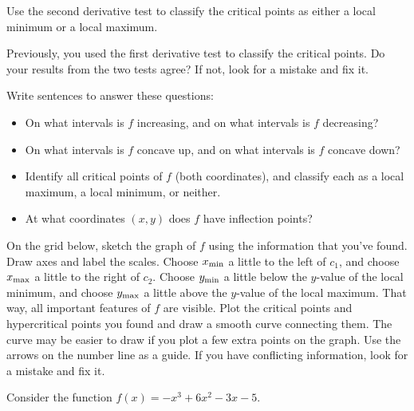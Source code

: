 \begin{ProblemSet}
\begin{Problem}[pencil space=0in]
 \end{Problem}

 \begin{Problem}
  Use the second derivative test to classify the critical points as either a local minimum or a local maximum.
 \end{Problem}
 \begin{Problem}[pencil space=0in]
  Previously, you used the first derivative test to classify the critical points.
  Do your results from the two tests agree?
  If not, look for a mistake and fix it.
 \end{Problem}

 \begin{Problem}[pencil space=3in]
  Write sentences to answer these questions:
  \begin{itemize}
  \item On what intervals is $f$ increasing, and on what intervals is $f$ decreasing?
  \item On what intervals is $f$ concave up, and on what intervals is $f$ concave down?
  \item Identify all critical points of $f$ (both coordinates), and classify each as a local maximum, a local minimum, or neither.
  \item At what coordinates $(x,y)$ does $f$ have inflection points?
  \end{itemize}
 \end{Problem}

 \begin{Problem}
  On the grid below, sketch the graph of $f$ using the information that you've found.
  Draw axes and label the scales.
  Choose $x_\mathrm{min}$ a little to the left of $c_1$, and choose $x_\mathrm{max}$ a little to the right of $c_2$.
  Choose $y_\mathrm{min}$ a little below the $y$-value of the local minimum, and choose $y_\mathrm{max}$ a little above the $y$-value of the local maximum.
  That way, all important features of $f$ are visible.
  Plot the critical points and hypercritical points you found and draw a smooth curve connecting them.
  The curve may be easier to draw if you plot a few extra points on the graph.
  Use the arrows on the number line as a guide.
  If you have conflicting information, look for a mistake and fix it.
 \end{Problem}
\end{ProblemSet}

\GraphingGrid

\newpage

Consider the function $f(x) = -x^3 + 6 x^2 - 3 x - 5$.

